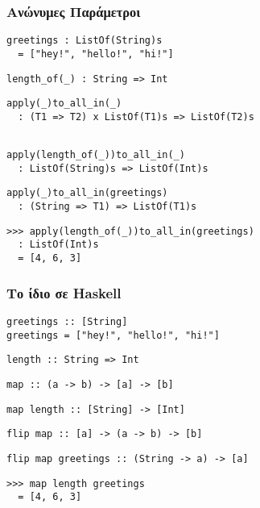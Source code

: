 \documentclass{beamer}
\def\e{\foreignlanguage{english}}
\def\h{\e{Haskell}}
\begin{document}
\begin{frame}[fragile]

\frametitle{Ανώνυμες Παράμετροι}

\begin{otherlanguage}{english}

\begin{verbatim}
greetings : ListOf(String)s
  = ["hey!", "hello!", "hi!"]
\end{verbatim}
\begin{verbatim}
length_of(_) : String => Int
\end{verbatim}
\begin{verbatim}
apply(_)to_all_in(_)
  : (T1 => T2) x ListOf(T1)s => ListOf(T2)s


\end{verbatim}
\begin{verbatim}
apply(length_of(_))to_all_in(_)
  : ListOf(String)s => ListOf(Int)s
\end{verbatim}
\begin{verbatim}
apply(_)to_all_in(greetings)
  : (String => T1) => ListOf(T1)s
\end{verbatim}
\begin{verbatim}
>>> apply(length_of(_))to_all_in(greetings)
  : ListOf(Int)s
  = [4, 6, 3]
\end{verbatim}

\end{otherlanguage}

\end{frame}

\begin{frame}[fragile]

\frametitle{Το ίδιο σε \h}

\begin{otherlanguage}{english}

\begin{verbatim}
greetings :: [String]
greetings = ["hey!", "hello!", "hi!"]
\end{verbatim}
\begin{verbatim}
length :: String => Int
\end{verbatim}
\begin{verbatim}
map :: (a -> b) -> [a] -> [b]

\end{verbatim}
\begin{verbatim}
map length :: [String] -> [Int]
\end{verbatim}
\begin{verbatim}
flip map :: [a] -> (a -> b) -> [b]
\end{verbatim}
\begin{verbatim}
flip map greetings :: (String -> a) -> [a]
\end{verbatim}
\begin{verbatim}
>>> map length greetings
  = [4, 6, 3]
\end{verbatim}

\end{otherlanguage}

\end{frame}
\end{document}
